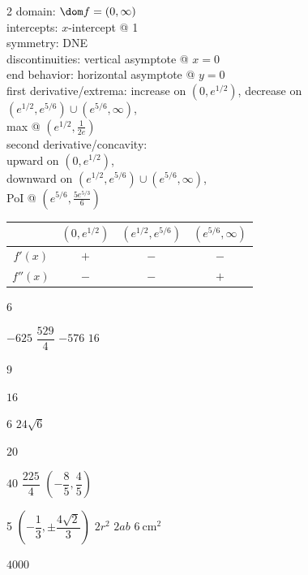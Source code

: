 \documentclass{book}
\begin{document}
\begin{appendices}
\begin{enumerate}[!HW!]
\begin{multicols}{2}
domain: $\dom f = (0, \infty)$ \\
intercepts: $x$-intercept @ 1\\
symmetry: DNE\\ 
discontinuities: vertical asymptote @ $x=0$\\
end behavior: horizontal asymptote @ $y=0$\\
first derivative/extrema: increase on $(0, e^{1/2})$, decrease on $(e^{1/2}, e^{5/6})\cup(e^{5/6},\infty)$,\\ max @ $\left(e^{1/2},\frac{1}{2e}\right)$\\
second derivative/concavity:\\ upward on $(0, e^{1/2})$,\\ downward on $(e^{1/2}, e^{5/6})\cup(e^{5/6},\infty)$,\\ PoI @ $\left(e^{5/6},\frac{5e^{5/3}}{6}\right)$\vspace{-15pt}
\begin{center}
\begin{tabular}{c|c|c|c}
 & $(0, e^{1/2})$ & $(e^{1/2}, e^{5/6})$ & $(e^{5/6},\infty)$ \\ \hline
$f'(x)$ & $+$ & $-$ & $-$ \\ 
$f''(x)$ & $-$ & $-$  & $+$ \\ 
\end{tabular}
\end{center}
\end{multicols}
\end{enumerate}\pagebreak

\rebootHW
\begin{enumerate}[!HW!]
\begin{multicols}{6}
\item $-625$
\itemspade $\dfrac{529}{4}$
\itemspade  $-576$
\itemspade  $16$
\item $9$
\item $16$
\end{multicols}
\begin{multicols}{6}
\itemspade  $24\sqrt{6}$
\item $20$
\item  $40$
\itemspade  $\dfrac{225}{4}$
\itemspade  $\left(-\dfrac{8}{5}, \dfrac{4}{5}\right)$
\end{multicols}
\begin{multicols}{5}
\itemspade  $\left(-\dfrac{1}{3}, \pm\dfrac{4\sqrt{2}}{3}\right)$
\itemspade  $2r^2$
\itemspade  $2ab$
\itemspade $6\ \text{cm}^2$
\item  $4000$
\end{multicols}
\end{enumerate}
\vspace{-15pt}


\end{appendices}
\end{document}
